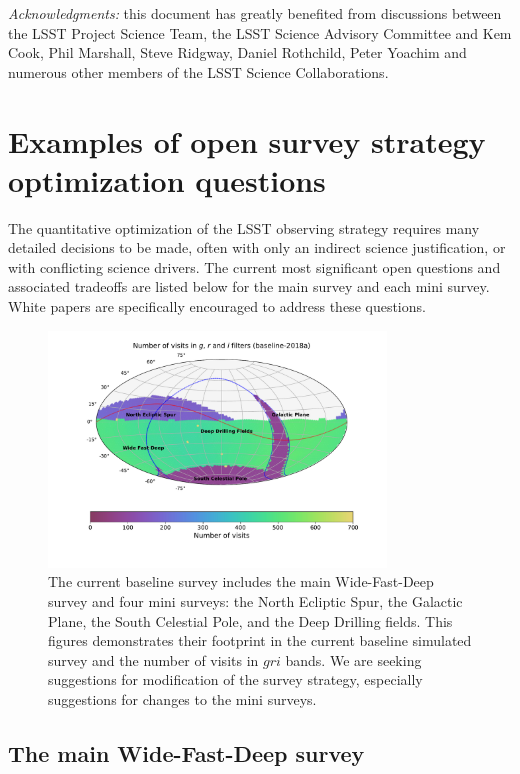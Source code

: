\documentclass[DM,lsstdraft,toc,usenatbib]{lsstdoc}
\begin{document}
\vskip 0.2in 
{\it Acknowledgments:} this document has greatly benefited from discussions between 
the LSST Project Science Team, the LSST Science Advisory Committee and Kem Cook, 
Phil Marshall, Steve Ridgway, Daniel Rothchild, Peter Yoachim and numerous other members 
of the LSST Science Collaborations. 

\newpage
\appendix
\section{Examples of open survey strategy optimization questions \label{sec:optimization}} 

The quantitative optimization of the LSST observing strategy requires many 
detailed decisions to be made, often with only an indirect science justification,
or with conflicting science drivers.  The current most significant open questions and associated 
tradeoffs are listed below for the main survey and each mini survey. White papers are specifically 
encouraged to address these questions.

\begin{figure}[htb]
\centering
\includegraphics[width=0.8\textwidth]{Nvisits_gri}
\caption{The current baseline survey includes the main Wide-Fast-Deep survey and four mini surveys:
the North Ecliptic Spur, the Galactic Plane, the South Celestial Pole, and the Deep Drilling fields. This figures
demonstrates their footprint in the current baseline simulated survey and the number of visits in $gri$ bands.
We are seeking suggestions for modification of the survey strategy, especially suggestions for changes to the
mini surveys.}
\end{figure}

\subsection{The main Wide-Fast-Deep survey} 
\end{document}
